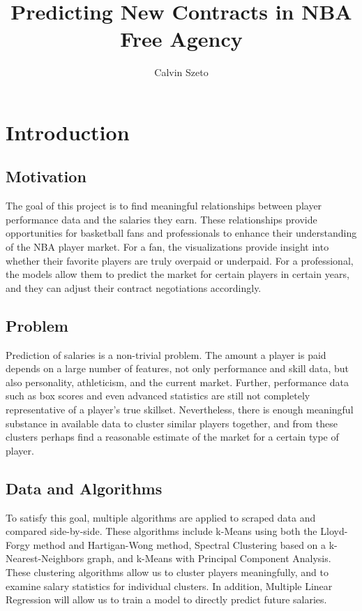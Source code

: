 \documentclass[letterpaper]{article}
\begin{document}
%
\title{Predicting New Contracts in NBA Free Agency}
\author{Calvin Szeto}
\maketitle
\section{Introduction}

\subsection{Motivation}

The goal of this project is to find meaningful relationships between player performance data and the salaries they earn. These relationships provide opportunities for basketball fans and professionals to enhance their understanding of the NBA player market. For a fan, the visualizations provide insight into whether their favorite players are truly overpaid or underpaid. For a professional, the models allow them to predict the market for certain players in certain years, and they can adjust their contract negotiations accordingly.

\subsection{Problem}

Prediction of salaries is a non-trivial problem. The amount a player is paid depends on a large number of features, not only performance and skill data, but also personality, athleticism, and the current market. Further, performance data such as box scores and even advanced statistics are still not completely representative of a player's true skillset. Nevertheless, there is enough meaningful substance in available data to cluster similar players together, and from these clusters perhaps find a reasonable estimate of the market for a certain type of player. 

\subsection{Data and Algorithms}

To satisfy this goal, multiple algorithms are applied to scraped data and compared side-by-side. These algorithms include k-Means using both the Lloyd-Forgy method and Hartigan-Wong method, Spectral Clustering based on a k-Nearest-Neighbors graph, and k-Means with Principal Component Analysis. These clustering algorithms allow us to cluster players meaningfully, and to examine salary statistics for individual clusters. In addition, Multiple Linear Regression will allow us to train a model to directly predict future salaries.
\end{document}
